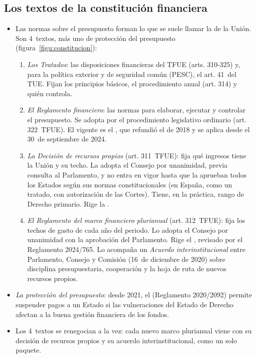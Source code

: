 \documentclass[11pt]{article}
\begin{document}
\subsection{Los textos de la constitución financiera}\label{sec:textos}

\begin{itemize}
\item Las normas sobre el presupuesto forman lo que se suele llamar la  de la Unión. Son 4~textos, más uno de protección del presupuesto (figura~\ref{figu:constitucion}):
  \begin{enumerate}
  \item \emph{Los Tratados}: las disposiciones financieras del TFUE (arts. 310-325) y, para la política exterior y de seguridad común (PESC), el art. 41~del TUE\nocite{UE2016TFUE,UE2016TUE}. Fijan los principios básicos, el procedimiento anual (art. 314) y quién controla.
  \item \emph{El Reglamento financiero}: las normas para elaborar, ejecutar y controlar el presupuesto. Se adopta por el procedimiento legislativo ordinario (art. 322~TFUE). El vigente es el , que refundió el de 2018 y se aplica desde el 30~de septiembre de 2024\nocite{UE2024ReglamentoFinanciero}.
  \item \emph{La Decisión de recursos propios} (art. 311~TFUE): fija qué ingresos tiene la Unión y su techo. La adopta el Consejo por unanimidad, previa consulta al Parlamento, y no entra en vigor hasta que la aprueban todos los Estados según sus normas constitucionales (en España, como un tratado, con autorización de las Cortes). Tiene, en la práctica, rango de Derecho primario. Rige la \nocite{UE2020DRP}.
  \item \emph{El Reglamento del marco financiero plurianual} (art. 312~TFUE): fija los techos de gasto de cada año del periodo. Lo adopta el Consejo por unanimidad con la aprobación del Parlamento. Rige el , revisado por el Reglamento 2024/765\nocite{UE2020MFP,UE2024RevisionMFP}. Lo acompaña un \emph{Acuerdo interinstitucional} entre Parlamento, Consejo y Comisión (16~de diciembre de 2020) sobre disciplina presupuestaria, cooperación y la hoja de ruta de nuevos recursos propios\nocite{UE2020AcuerdoInterinstitucional}.
  \end{enumerate}
\item \emph{La protección del presupuesto}: desde 2021, el  (Reglamento 2020/2092) permite suspender pagos a un Estado si las vulneraciones del Estado de Derecho afectan a la buena gestión financiera de los fondos\nocite{UE2020Condicionalidad}.
\item Los 4~textos se renegocian a la vez: cada nuevo marco plurianual viene con su decisión de recursos propios y su acuerdo interinstitucional, como un solo paquete.
\end{itemize}
\end{document}
